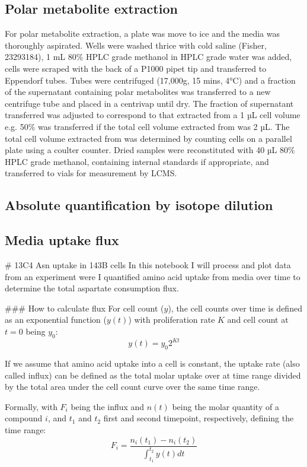 \subsection{Polar metabolite extraction}
For polar metabolite extraction, a plate was move to ice and the media was thoroughly aspirated.
Wells were washed thrice with cold saline (Fisher, 23293184), 1 mL 80\% HPLC grade methanol in HPLC grade water was added, cells were scraped with the back of a P1000 pipet tip and transferred to Eppendorf tubes.
Tubes were centrifuged (17,000g, 15 mins, 4°C) and a fraction of the supernatant containing polar metabolites was transferred to a new centrifuge tube and placed in a centrivap until dry.
The fraction of supernatant transferred was adjusted to correspond to that extracted from a 1 µL cell volume e.g. 50\% was transferred if the total cell volume extracted from was 2 µL.
The total cell volume extracted from was determined by counting cells on a parallel plate using a coulter counter.
Dried samples were reconstituted with 40 µL 80\% HPLC grade methanol, containing internal standards if appropriate, and transferred to vials for measurement by LCMS.




\subsection{Absolute quantification by isotope dilution}



\subsection{Media uptake flux}

# 13C4 Asn uptake in 143B cells
In this notebook I will process and plot data from an experiment were I quantified amino acid uptake from media over time to determine the total aspartate consumption flux.



### How to calculate flux
For cell count ($y$), the cell counts over time is defined as an exponential function ($y(t)$) with proliferation rate $K$ and cell count at $t=0$ being $y_0$:
$$
y(t) = y_0 2^{K t}
$$

If we assume that amino acid uptake into a cell is constant, the uptake rate (also called influx) can be defined as the total molar uptake over at time range divided by the total area under the cell count curve over the same time range.

Formally, with $F_i$ being the influx and $n(t)$ being the molar quantity of a compound $i$, and $t_1$ and $t_2$ first and second timepoint, respectively, defining the time range:
$$
F_i = \frac{n_i(t_1) - n_i(t_2)}{\int_{t_1}^{t_2} y(t) dt}
$$

